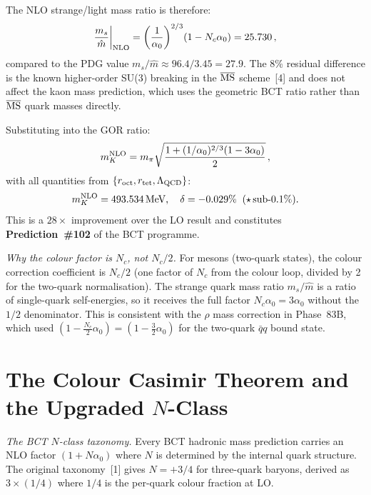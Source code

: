 \documentclass[10pt,twocolumn]{article}
\begin{document}
The NLO strange/light mass ratio is therefore:
\begin{equation}
\frac{m_s}{\hat{m}}\bigg|_{\rm NLO}
  = \left(\frac{1}{\alpha_0}\right)^{2/3}\!(1-N_c\alpha_0) = 25.730\,,
\label{eq:ratio}
\end{equation}
compared to the PDG value $m_s/\hat{m} \approx 96.4/3.45 = 27.9$. The 8\% residual difference
is the known higher-order SU(3) breaking in the $\overline{\rm MS}$ scheme~[4] and does not
affect the kaon mass prediction, which uses the geometric BCT ratio rather than
$\overline{\rm MS}$ quark masses directly.

Substituting into the GOR ratio:
\begin{equation}
m_K^{\rm NLO} = m_\pi\sqrt{\frac{1+(1/\alpha_0)^{2/3}(1-3\alpha_0)}{2}}\,,
\label{eq:mKNLO2}
\end{equation}
with all quantities from $\{r_{\rm oct}, r_{\rm tet}, \Lambda_{\rm QCD}\}$:
\begin{equation}
m_K^{\rm NLO} = 493.534\,\text{MeV},\quad
\delta = -0.029\%\;\;(\star\,\text{sub-0.1\%}).
\label{eq:mKresult}
\end{equation}
This is a $28\times$ improvement over the LO result and constitutes \textbf{Prediction~\#102}
of the BCT programme.

\textit{Why the colour factor is $N_c$, not $N_c/2$.} For mesons (two-quark states), the colour
correction coefficient is $N_c/2$ (one factor of $N_c$ from the colour loop, divided by 2 for
the two-quark normalisation). The strange quark mass ratio $m_s/\hat{m}$ is a ratio of
single-quark self-energies, so it receives the full factor $N_c\alpha_0 = 3\alpha_0$ without
the $1/2$ denominator. This is consistent with the $\rho$ mass correction in Phase~83B, which
used $(1 - \tfrac{N_c}{2}\alpha_0) = (1 - \tfrac{3}{2}\alpha_0)$ for the two-quark $\bar{q}q$
bound state.

\section{The Colour Casimir Theorem and the Upgraded $N$-Class}

\textit{The BCT $N$-class taxonomy.} Every BCT hadronic mass prediction carries an NLO factor
$(1+N\alpha_0)$ where $N$ is determined by the internal quark structure. The original
taxonomy~[1] gives $N = +3/4$ for three-quark baryons, derived as $3\times(1/4)$ where $1/4$
is the per-quark colour fraction at LO.
\end{document}
